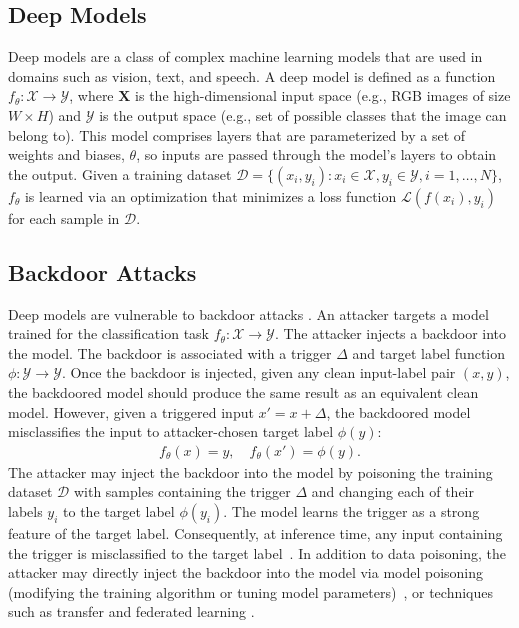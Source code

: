 \documentclass[letterpaper,twocolumn,10pt]{article}
\begin{document}
\subsection{Deep Models}

Deep models are a class of complex machine learning models that are used in domains such as vision, text, and speech. A deep model is defined as a function $f_{\theta}: \mathcal{X} \rightarrow \mathcal{Y}$, where $\textbf{X}$ is the high-dimensional input space (e.g., RGB images of size $W \times H$) and $\mathcal{Y}$ is the output space (e.g., set of possible classes that the image can belong to). This model comprises layers that are parameterized by a set of weights and biases, $\theta$, so inputs are passed through the model's layers to obtain the output. Given a training dataset $\mathcal{D}=\{(x_{i},y_{i}):x_{i}\in\mathcal{X},y_{i}\in\mathcal{Y}, i = 1,\ldots,N \}$, $f_{\theta}$ is learned via an optimization that minimizes a loss function $\mathcal{L}(f(x_{i}), y_{i})$ for each sample in $\mathcal{D}$.

\subsection{Backdoor Attacks}
\label{sec:attacks}

Deep models are vulnerable to backdoor attacks \cite{barreno2010security, li2022survey}. An attacker targets a model trained for the classification task $f_{\theta}: \mathcal{X} \to \mathcal{Y}$. The attacker injects a backdoor into the model. The backdoor is associated with a trigger $\Delta$ and target label function $\phi:\mathcal{Y} \to \mathcal{Y}$. Once the backdoor is injected, given any clean input-label pair $(x,y)$, the backdoored model should produce the same result as an equivalent clean model. However, given a triggered input $x'=x+\Delta$, the backdoored model misclassifies the input to attacker-chosen target label $\phi(y)$:
\begin{equation}
\label{eq:poison}
\begin{split}
    f_{\theta}(x)=y,\quad f_{\theta}(x')=\phi(y).
\end{split}
\end{equation}
The attacker may inject the backdoor into the model by poisoning the training dataset $\mathcal{D}$ with samples containing the trigger $\Delta$ and changing each of their labels $y_{i}$ to the target label $\phi(y_{i})$. The model learns the trigger as a strong feature of the target label. Consequently, at inference time, any input containing the trigger is misclassified to the target label~\cite{turner2019labelconsistent}. In addition to data poisoning, the attacker may directly inject the backdoor into the model via model poisoning (modifying the training algorithm or tuning model parameters)~\cite{dumford2020weights, salem2020dont}, or techniques such as transfer and federated learning \cite{wang2022transfer, bagdasaryan20federated}.
\end{document}
